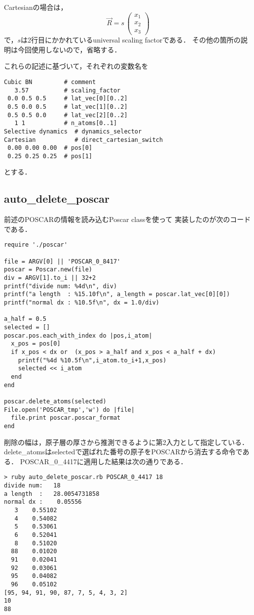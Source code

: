 \documentclass[11pt,dvipdfmx]{jsarticle}
\begin{document}
Cartesianの場合は， \[
\overrightarrow{R} = s \,
\left(\begin{array}{cc}
x_1\\
x_2\\
x_3
\end{array}\right)
\] で，\(s\)は2行目にかかれているuniversal scaling factorである．
その他の箇所の説明は今回使用しないので，省略する．

これらの記述に基づいて，それぞれの変数名を

\begin{verbatim}
Cubic BN         # comment
   3.57          # scaling_factor
 0.0 0.5 0.5     # lat_vec[0][0..2]
 0.5 0.0 0.5     # lat_vec[1][0..2]
 0.5 0.5 0.0     # lat_vec[2][0..2]
   1 1           # n_atoms[0..1]
Selective dynamics  # dynamics_selector
Cartesian           # direct_cartesian_switch
 0.00 0.00 0.00  # pos[0]
 0.25 0.25 0.25  # pos[1]
\end{verbatim}

とする．

    \subsection{auto\_delete\_poscar}\label{auto_delete_poscar}

前述のPOSCARの情報を読み込むPoscar classを使って
実装したのが次のコードである．

\begin{verbatim}
require './poscar'

file = ARGV[0] || 'POSCAR_0_8417'
poscar = Poscar.new(file)
div = ARGV[1].to_i || 32+2
printf("divide num: %4d\n", div)
printf("a length  : %15.10f\n", a_length = poscar.lat_vec[0][0])
printf("normal dx : %10.5f\n", dx = 1.0/div)

a_half = 0.5
selected = []
poscar.pos.each_with_index do |pos,i_atom|
  x_pos = pos[0]
  if x_pos < dx or  (x_pos > a_half and x_pos < a_half + dx)
    printf("%4d %10.5f\n",i_atom.to_i+1,x_pos)
    selected << i_atom
  end
end

poscar.delete_atoms(selected)
File.open('POSCAR_tmp','w') do |file|
  file.print poscar.poscar_format
end
\end{verbatim}

削除の幅は，原子層の厚さから推測できるように第2入力として指定している．
delete\_atomsはselectedで選ばれた番号の原子をPOSCARから消去する命令である．
POSCAR\_0\_4417に適用した結果は次の通りである．

\begin{verbatim}
> ruby auto_delete_poscar.rb POSCAR_0_4417 18
divide num:   18
a length  :   28.0054731858
normal dx :    0.05556
   3    0.55102
   4    0.54082
   5    0.53061
   6    0.52041
   8    0.51020
  88    0.01020
  91    0.02041
  92    0.03061
  95    0.04082
  96    0.05102
[95, 94, 91, 90, 87, 7, 5, 4, 3, 2]
10
88
\end{verbatim}
\end{document}
